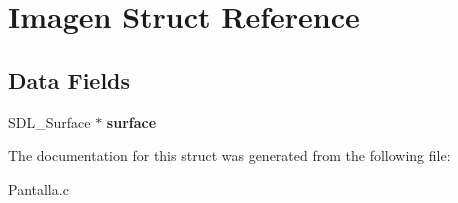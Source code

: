 \hypertarget{struct_imagen}{}\section{Imagen Struct Reference}
\label{struct_imagen}
\subsection*{Data Fields}
\begin{DoxyCompactItemize}
\item 
\mbox{\label{struct_imagen_a2f5cac12e913bcfcff660305bf88dd3b}} 
S\+D\+L\+\_\+\+Surface $\ast$ {\bfseries surface}
\end{DoxyCompactItemize}


The documentation for this struct was generated from the following file\+:\begin{DoxyCompactItemize}
\item 
Pantalla.\+c\end{DoxyCompactItemize}
